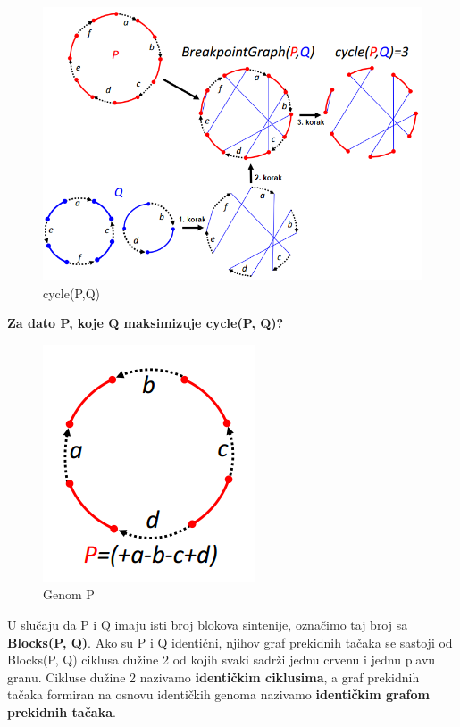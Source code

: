 \begin{figure}[h!]
\centering
\includegraphics[scale=0.55]{poglavlja/6/slike/cycle.PNG}
\caption{cycle(P,Q)}
\label{slika:X}
\end{figure}
\newpage
\noindent \textbf{ Za dato P, koje Q maksimizuje cycle(P, Q)?}\\

\begin{figure}[h!]
\centering
\includegraphics[scale=0.7]{poglavlja/6/slike/Pabcd.PNG}
\caption{Genom P}
\label{slika:X}
\end{figure}

U slučaju da P i Q imaju isti broj blokova sintenije, označimo taj broj sa \textbf{Blocks(P, Q)}. Ako su P i Q identični, njihov graf prekidnih tačaka se sastoji od Blocks(P, Q) ciklusa dužine 2 od kojih svaki sadrži jednu crvenu i jednu plavu granu. Cikluse dužine 2 nazivamo \textbf{identičkim ciklusima}, a graf prekidnih tačaka formiran na osnovu identičkih genoma nazivamo \textbf{identičkim grafom prekidnih tačaka}.

